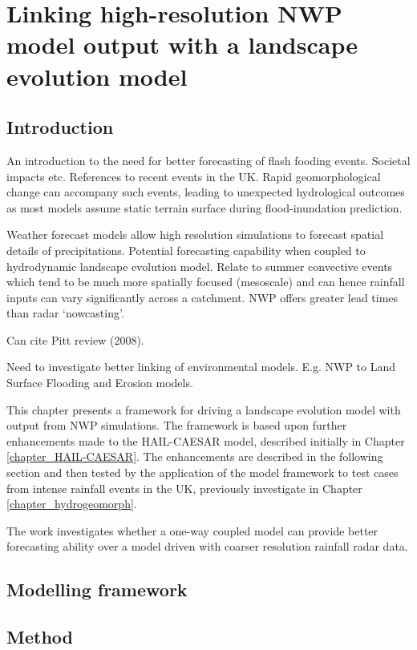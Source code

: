 \chapter{Linking high-resolution NWP model output with a landscape evolution model}
\label{appendix_wrf_lem}
\section{Introduction}

An introduction to the need for better forecasting of flash fooding events. Societal impacts etc. References to recent events in the UK. Rapid geomorphological change can accompany such events, leading to unexpected hydrological outcomes as most models assume static terrain surface during flood-inundation prediction.

Weather forecast models allow high resolution simulations to forecast spatial details of precipitations. Potential forecasting capability when coupled to hydrodynamic landscape evolution model. Relate to summer convective events which tend to be much more spatially focused (mesoscale) and can hence rainfall inputs can vary significantly across a catchment. NWP offers greater lead times than radar `nowcasting'. 

Can cite Pitt review (2008).

Need to investigate better linking of environmental models. E.g. NWP to Land Surface Flooding and Erosion models.

This chapter presents a framework for driving a landscape evolution model with output from NWP simulations. The framework is based upon further enhancements made to the HAIL-CAESAR model, described initially in Chapter \ref{chapter_HAIL-CAESAR}. The enhancements are described in the following section and then tested by the application of the model framework to test cases from intense rainfall events in the UK, previously investigate in Chapter \ref{chapter_hydrogeomorph}.

The work investigates whether a one-way coupled model can provide better forecasting ability over a model driven with coarser resolution rainfall radar data.

\section{Modelling framework}


\section{Method}

